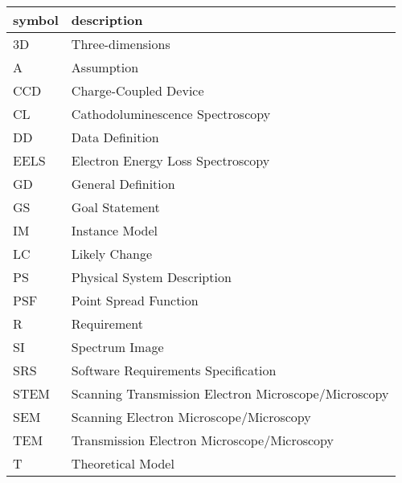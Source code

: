 \renewcommand{\arraystretch}{1.2}
\begin{tabular}{l l} 
  \toprule		
  \textbf{symbol} & \textbf{description}\\
  \midrule 
  3D & Three-dimensions\\
  A & Assumption\\
  CCD & Charge-Coupled Device\\
  CL & Cathodoluminescence Spectroscopy\\
  DD & Data Definition\\
  EELS & Electron Energy Loss Spectroscopy\\
  GD & General Definition\\
  GS & Goal Statement\\
  IM & Instance Model\\
  LC & Likely Change\\
  PS & Physical System Description\\
  PSF & Point Spread Function\\
  R & Requirement\\
  SI & Spectrum Image\\
  SRS & Software Requirements Specification\\
  STEM & Scanning Transmission Electron Microscope/Microscopy\\
  SEM & Scanning Electron Microscope/Microscopy\\
  TEM & Transmission Electron Microscope/Microscopy\\
  T & Theoretical Model\\
  \bottomrule
\end{tabular}\\